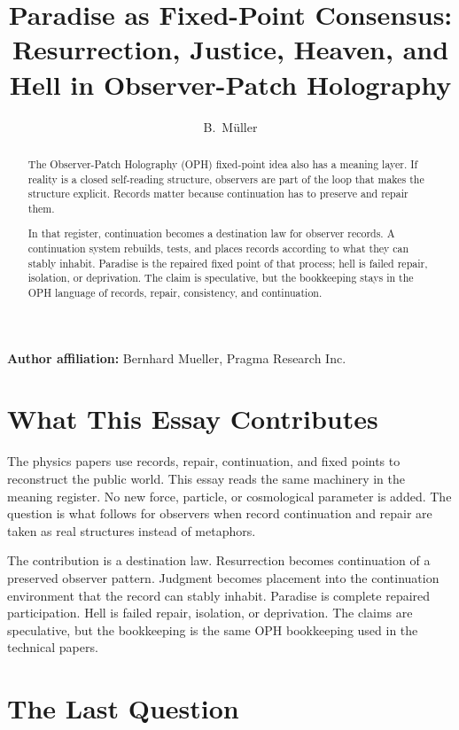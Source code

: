 \documentclass[11pt]{article}
\title{Paradise as Fixed-Point Consensus:\\
Resurrection, Justice, Heaven, and Hell in Observer-Patch Holography}
\author{B.\ M\"uller}
\date{\OPHPaperReleaseDate}
\theoremstyle{remark}
\theoremstyle{plain}
\begin{document}
\maketitle
\OPHPaperReleaseBanner

\begin{center}
\small\textbf{Author affiliation:} Bernhard Mueller, Pragma Research Inc.
\end{center}

\begin{abstract}
The Observer-Patch Holography (OPH) fixed-point idea also has a meaning layer. If reality is a closed self-reading structure, observers are part of the loop that makes the structure explicit. Records matter because continuation has to preserve and repair them.

In that register, continuation becomes a destination law for observer records.
A continuation system rebuilds, tests, and places records according to what they
can stably inhabit. Paradise is the repaired fixed point of that process; hell
is failed repair, isolation, or deprivation. The claim is speculative, but the
bookkeeping stays in the OPH language of records, repair, consistency, and
continuation.
\end{abstract}

\section*{What This Essay Contributes}

The physics papers use records, repair, continuation, and fixed points to
reconstruct the public world. This essay reads the same machinery in the
meaning register. No new force, particle, or cosmological parameter is added.
The question is what follows for observers when record continuation and repair
are taken as real structures instead of metaphors.

The contribution is a destination law. Resurrection becomes continuation of a
preserved observer pattern. Judgment becomes placement into the continuation
environment that the record can stably inhabit. Paradise is complete repaired
participation. Hell is failed repair, isolation, or deprivation. The claims are
speculative, but the bookkeeping is the same OPH bookkeeping used in the
technical papers.

\tableofcontents

\section{The Last Question}
\end{document}
